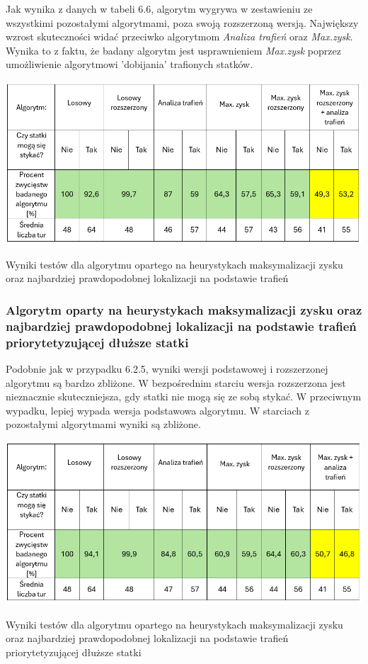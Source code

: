Jak wynika z danych w tabeli 6.6, algorytm wygrywa w zestawieniu ze wszystkimi pozostałymi algorytmami, poza swoją rozszerzoną wersją. Największy wzrost skuteczności widać przeciwko algorytmom \emph{Analiza trafień} oraz \emph{Max.zysk}. Wynika to z faktu, że badany algorytm jest usprawnieniem \emph{Max.zysk} poprzez umożliwienie algorytmowi 'dobijania' trafionych statków.

\begin{table}[!h]
    \centering
    \includegraphics[width=1\linewidth]{img/table-location-hit-heuristic.png}
    \caption{Wyniki testów dla algorytmu opartego na heurystykach maksymalizacji zysku oraz najbardziej prawdopodobnej lokalizacji na podstawie trafień}
\end{table}

\subsubsection{Algorytm oparty na heurystykach maksymalizacji zysku oraz najbardziej prawdopodobnej lokalizacji na podstawie trafień priorytetyzującej dłuższe statki}

Podobnie jak w przypadku 6.2.5, wyniki wersji podstawowej i rozszerzonej algorytmu są bardzo zbliżone. W bezpośrednim starciu wersja rozszerzona jest nieznacznie skuteczniejsza, gdy statki nie mogą się ze sobą stykać. W przeciwnym wypadku, lepiej wypada wersja podstawowa algorytmu. W starciach z pozostałymi algorytmami wyniki są zbliżone.

\begin{table}[!h]
    \centering
    \includegraphics[width=1\linewidth]{img/table-location-extended-hit-heuristic.png}
    \caption{Wyniki testów dla algorytmu opartego na heurystykach maksymalizacji zysku oraz najbardziej prawdopodobnej lokalizacji na podstawie trafień priorytetyzującej dłuższe statki}
\end{table}

